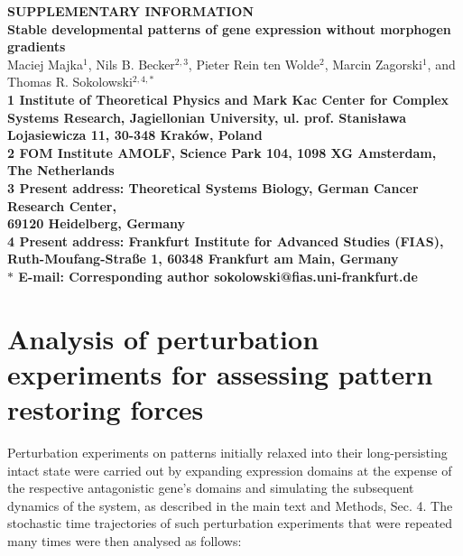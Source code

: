 \documentclass[10pt]{article}
\date{}
\begin{document}
\begin{flushleft}
{\Large
\textbf{SUPPLEMENTARY INFORMATION}\\
\vspace{1em}
\textbf{Stable developmental patterns of gene expression without morphogen gradients}
}
\\
\vspace{1em}
Maciej Majka$^{1}$, 
Nils B. Becker$^{2,3}$,
Pieter Rein ten Wolde$^{2}$, 
Marcin Zagorski$^{1}$,
and Thomas R. Sokolowski$^{2,4,\ast}$
\\
\bf{1} Institute of Theoretical Physics and Mark Kac Center for Complex  Systems Research, Jagiellonian  University, ul. prof. Stanis\l{}awa   Lojasiewicza 11, 30-348 Krak\'{o}w, Poland
\\
\bf{2} FOM Institute AMOLF, Science Park 104, 1098 XG Amsterdam, The Netherlands
\\
\bf{3} Present address: Theoretical Systems Biology, German Cancer Research Center, \\69120 Heidelberg, Germany
\\
\bf{4} Present address: Frankfurt Institute for Advanced Studies (FIAS), Ruth-Moufang-Straße 1, 60348 Frankfurt am Main, Germany
\\
\vspace{1ex}
$\ast$ E-mail: Corresponding author sokolowski@fias.uni-frankfurt.de
\end{flushleft}

\vspace*{1cm}

\section{Analysis of perturbation experiments for assessing pattern restoring forces}

Perturbation experiments on patterns initially relaxed into their long-persisting intact state were carried out by expanding expression domains at the expense of the respective antagonistic gene's domains and simulating the subsequent dynamics of the system, as described in the main text and Methods, Sec. 4. The stochastic time trajectories of such perturbation experiments that were repeated many times were then analysed as follows:
\end{document}
